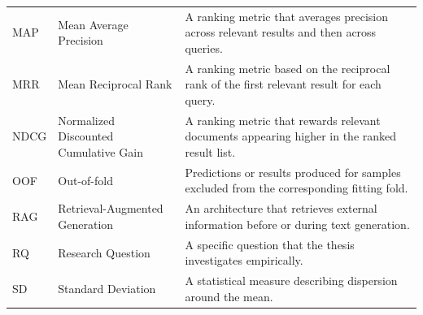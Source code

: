 \begin{longtable}{>{\raggedright\arraybackslash}p{2.486cm}>{\raggedright\arraybackslash}p{5.073cm}>{\raggedright\arraybackslash}p{7.781cm}}
MAP & Mean Average Precision & A ranking metric that averages precision across relevant results and then across queries. \\
MRR & Mean Reciprocal Rank & A ranking metric based on the reciprocal rank of the first relevant result for each query. \\
NDCG & Normalized Discounted Cumulative Gain & A ranking metric that rewards relevant documents appearing higher in the ranked result list. \\
OOF & Out-of-fold & Predictions or results produced for samples excluded from the corresponding fitting fold. \\
RAG & Retrieval-Augmented Generation & An architecture that retrieves external information before or during text generation. \\
RQ & Research Question & A specific question that the thesis investigates empirically. \\
SD & Standard Deviation & A statistical measure describing dispersion around the mean. \\
\end{longtable}
\endgroup
